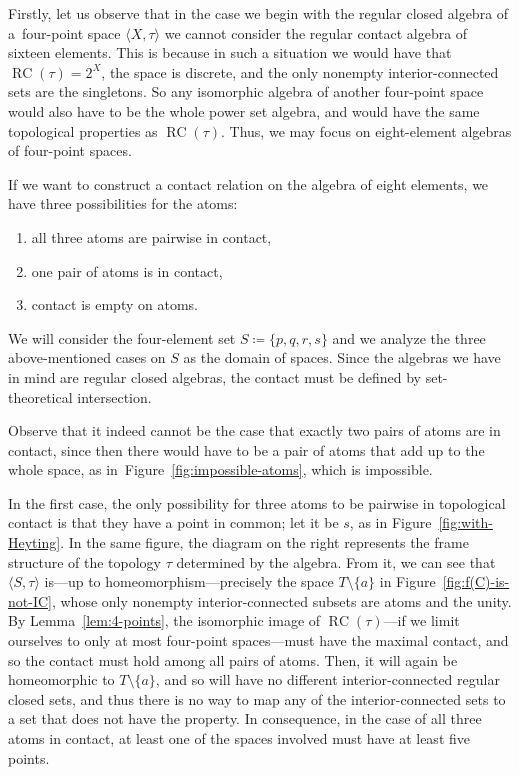 \documentclass[a4paper,12pt]{amsart}
\numberwithin{equation}{section}
\theoremstyle{mytheoremstyle}
\DeclareMathOperator{\RCvtex}{RC}
\begin{document}
Firstly, let us observe that in the case we begin with the regular closed
algebra of a~four-point space $\langle X,\tau \rangle $ we cannot consider
the regular contact algebra of sixteen elements. This is because in such a
situation we would have that $\RCvtex (\tau )=2^{X}$, the space is discrete,
and the only nonempty interior-connected sets are the singletons. So any
isomorphic algebra of another four-point space would also have to be the
whole power set algebra, and would have the same topological properties
as $\RCvtex (\tau )$. Thus, we may focus on eight-element algebras of four-point
spaces.

If we want to construct a contact relation on the algebra of eight elements,
we have three possibilities for the atoms:
%
\begin{enumerate}
%
\item[1.] all three atoms are pairwise in contact,
%
\item[2.] one pair of atoms is in contact,
%
\item[3.] contact is empty on atoms.
%
\end{enumerate}
%
We will consider the four-element set $S\coloneqq \{p,q,r,s\}$ and we analyze the three above-mentioned cases on $S$ as the domain of spaces. Since the algebras we have in mind are regular closed algebras, the contact must be defined by set-theoretical intersection.


Observe that it indeed cannot be the case that exactly two pairs of atoms are in contact, since then there would have to be a pair of atoms that add up to the whole space, as in~Figure~\ref{fig:impossible-atoms}, which is impossible.

In the first case, the only possibility
for three atoms to be pairwise in topological contact is that they have
a point in common; let it be $s$, as in Figure~\ref{fig:with-Heyting}.
In the same figure, the diagram on the right represents the frame structure
of the topology $\tau $ determined by the algebra. From it, we can see
that $  \langle S,\tau   \rangle $ is---up to homeomorphism---precisely
the space $T\setminus \{a\}$ in Figure~\ref{fig:f(C)-is-not-IC}, whose
only nonempty interior-connected subsets are atoms and the unity. By Lemma~\ref{lem:4-points},
the isomorphic image of $\RCvtex (\tau )$---if we limit ourselves to only at
most four-point spaces---must have the maximal contact, and so the contact
must hold among all pairs of atoms. Then, it will again be homeomorphic
to $T\setminus \{a\}$, and so will have no different interior-connected
regular closed sets, and thus there is no way to map any of the interior-connected
sets to a set that does not have the property. In consequence, in the case
of all three atoms in contact, at least one of the spaces involved must
have at least five points.
\end{document}
